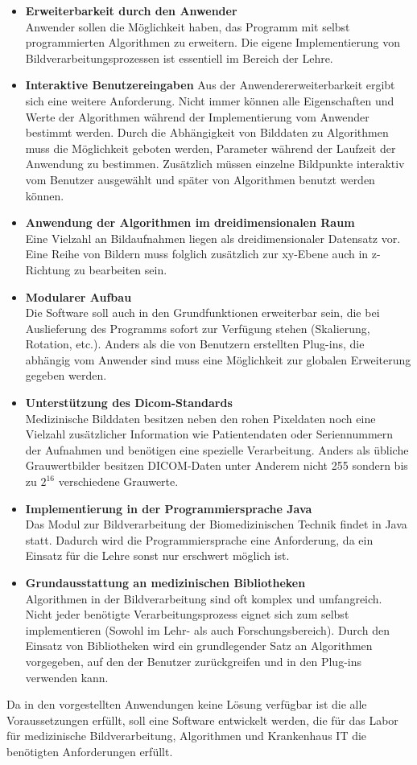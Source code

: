 \begin{itemize}
\item \textbf{Erweiterbarkeit durch den Anwender} \\
	  Anwender sollen die Möglichkeit haben, das Programm mit selbst programmierten Algorithmen zu erweitern. Die eigene Implementierung von Bildverarbeitungsprozessen ist essentiell im Bereich der Lehre.
	  
\item \textbf{Interaktive Benutzereingaben}
	  Aus der Anwendererweiterbarkeit ergibt sich eine weitere Anforderung. Nicht immer können alle Eigenschaften und Werte der Algorithmen während der Implementierung vom Anwender bestimmt werden. Durch die Abhängigkeit von Bilddaten zu Algorithmen muss die Möglichkeit geboten werden, Parameter während der Laufzeit der Anwendung zu bestimmen. Zusätzlich müssen einzelne Bildpunkte interaktiv vom Benutzer ausgewählt und später von Algorithmen benutzt werden können.

\item \textbf{Anwendung der Algorithmen im dreidimensionalen Raum}\\
	  Eine Vielzahl an Bildaufnahmen liegen als dreidimensionaler Datensatz vor. Eine Reihe von Bildern muss folglich zusätzlich zur xy-Ebene auch in z-Richtung zu bearbeiten sein.

\item \textbf{Modularer Aufbau} \\
	  Die Software soll auch in den Grundfunktionen erweiterbar sein, die bei Auslieferung des Programms sofort zur Verfügung stehen (Skalierung, Rotation, etc.). Anders als die von Benutzern erstellten Plug-ins, die abhängig vom Anwender sind muss eine Möglichkeit zur globalen Erweiterung gegeben werden.

\item \textbf{Unterstützung des Dicom-Standards}\\
	  Medizinische Bilddaten besitzen neben den rohen Pixeldaten noch eine Vielzahl zusätzlicher Information wie Patientendaten oder Seriennummern der Aufnahmen und benötigen eine spezielle Verarbeitung. Anders als übliche Grauwertbilder besitzen DICOM-Daten unter Anderem nicht 255 sondern bis zu $2^{16}$ verschiedene Grauwerte.

\item \textbf{Implementierung in der Programmiersprache Java}\\
	  Das Modul zur Bildverarbeitung der Biomedizinischen Technik findet in Java statt. Dadurch wird die Programmiersprache eine Anforderung, da ein Einsatz für die Lehre sonst nur erschwert möglich ist.

\item \textbf{Grundausstattung an medizinischen Bibliotheken}\\
	  Algorithmen in der Bildverarbeitung sind oft komplex und umfangreich. Nicht jeder benötigte Verarbeitungsprozess eignet sich zum selbst implementieren (Sowohl im Lehr- als auch Forschungsbereich). Durch den Einsatz von Bibliotheken wird ein grundlegender Satz an Algorithmen vorgegeben, auf den der Benutzer zurückgreifen und in den Plug-ins verwenden kann.
\end{itemize}

Da in den vorgestellten Anwendungen keine Lösung verfügbar ist die alle Voraussetzungen erfüllt, soll eine Software entwickelt werden, die für das Labor für medizinische Bildverarbeitung, Algorithmen und Krankenhaus IT die benötigten Anforderungen erfüllt.